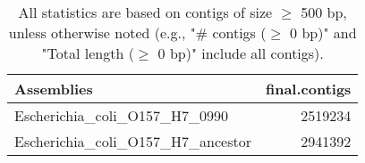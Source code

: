 \documentclass[12pt,a4paper]{article}
\begin{document}
\begin{table}[ht]
\begin{center}
\caption{All statistics are based on contigs of size $\geq$ 500 bp, unless otherwise noted (e.g., "\# contigs ($\geq$ 0 bp)" and "Total length ($\geq$ 0 bp)" include all contigs).}
\begin{tabular}{|l*{1}{|r}|}
\hline
Assemblies & final.contigs \\ \hline
Escherichia\_coli\_O157\_H7\_0990 & 2519234 \\ \hline
Escherichia\_coli\_O157\_H7\_ancestor & 2941392 \\ \hline
\end{tabular}
\end{center}
\end{table}
\end{document}
